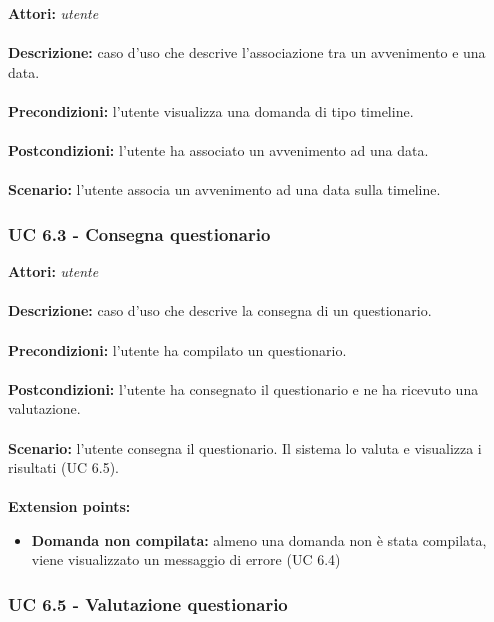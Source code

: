 \documentclass[a4paper,11pt]{article}
\begin{document}

\textbf{Attori:} \textit{utente}
\\ \\
\textbf{Descrizione:} caso d'uso che descrive l'associazione tra un avvenimento e una data.\\
\\
\textbf{Precondizioni:} l'utente visualizza una domanda di tipo timeline.\\
\\
\textbf{Postcondizioni:} l'utente ha associato un avvenimento ad una data.\\
\\
\textbf{Scenario:} l’utente associa un avvenimento ad una data sulla timeline.\\


\subsubsection{UC 6.3 - Consegna questionario}

\textbf{Attori:} \textit{utente}
\\ \\
\textbf{Descrizione:} caso d'uso che descrive la consegna di un questionario.\\
\\
\textbf{Precondizioni:} l'utente ha compilato un questionario.\\
\\
\textbf{Postcondizioni:} l’utente ha consegnato il questionario e ne ha ricevuto una valutazione.\\
\\
\textbf{Scenario:} l’utente consegna il questionario. Il sistema lo valuta e visualizza i risultati (UC 6.5).\\
\\
\textbf{Extension points:} 
\begin{itemize}
	\item \textbf{Domanda non compilata:} almeno una domanda non  è stata compilata, viene visualizzato un messaggio di errore (UC 6.4)
\end{itemize}


\newpage
\subsubsection{UC 6.5 - Valutazione questionario}
\end{document}
